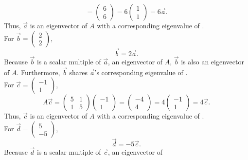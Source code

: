 \documentclass[12pt]{article}
\begin{document}
\begin{enumerate}[label=(\alph*)]
\begin{equation*}
		=
		\begin{pmatrix} 6 \\ 6 \end{pmatrix}
		=
		6
		\begin{pmatrix} 1 \\ 1 \end{pmatrix}
		=
		6 \vec{a}
		.
	\end{equation*}
	Thus, $\vec{a}$ is an eigenvector of $A$ with a corresponding eigenvalue
	of .
	\\[\baselineskip]
	For $\vec{b} = \begin{pmatrix} 2 \\ 2 \end{pmatrix}$,
	\begin{equation*}
		\vec{b} = 2 \vec{a}
		.
	\end{equation*}
	Because $\vec{b}$ is a scalar multiple of $\vec{a}$, an eigenvector of
	$A$, $\vec{b}$ is also an eigenvector of $A$. Furthermore, $\vec{b}$
	shares $\vec{a}$'s corresponding eigenvalue of .
	\\[\baselineskip]
	For $\vec{c} = \begin{pmatrix} -1 \\ 1 \end{pmatrix}$,
	\begin{equation*}
		A \vec{c}
		=
		\begin{pmatrix} 5 & 1 \\ 1 & 5 \end{pmatrix}
		\begin{pmatrix} -1 \\ 1 \end{pmatrix}
		=
		\begin{pmatrix} -4 \\ 4 \end{pmatrix}
		=
		4
		\begin{pmatrix} -1 \\ 1 \end{pmatrix}
		=
		4 \vec{c}
		.
	\end{equation*}
	Thus, $\vec{c}$ is an eigenvector of $A$ with a corresponding eigenvalue
	of .
	\\[\baselineskip]
	For $\vec{d} = \begin{pmatrix} 5 \\ -5 \end{pmatrix}$,
	\begin{equation*}
		\vec{d} = -5 \vec{c}
		.
	\end{equation*}
	Because $\vec{d}$ is a scalar multiple of $\vec{c}$, an eigenvector of

\end{enumerate}
\end{document}
